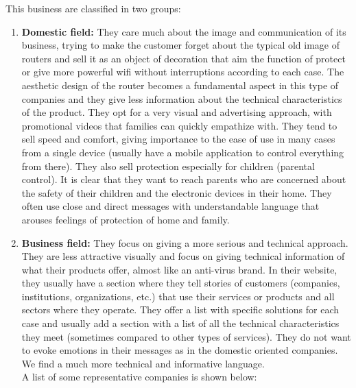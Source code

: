 This business are classified in two groups:
\begin{enumerate}
	\item \textbf{Domestic field:} They care much about the image and communication of its business, trying to make the customer forget about the typical old image of routers and sell it as an object of decoration that aim the function of protect or give more powerful wifi without interruptions according to each case. The aesthetic design of the router becomes a fundamental aspect in this type of companies and they give less information about the technical characteristics of the product. They opt for a very visual and advertising approach, with promotional videos that families can quickly empathize with. They tend to sell speed and comfort, giving importance to the ease of use in many cases from a single device (usually have a mobile application to control everything from there). They also sell protection especially for children (parental control). It is clear that they want to reach parents who are concerned about the safety of their children and the electronic devices in their home. They often use close and direct messages with understandable language that arouses feelings of protection of home and family.
	
	\item \textbf{Business field:} They focus on giving a more serious and technical approach. They are less attractive visually and focus on giving technical information of what their products offer, almost like an anti-virus brand. In their website, they usually have a section where they tell stories of customers (companies, institutions, organizations, etc.) that use their services or products and all sectors where they operate. They offer a list with specific solutions for each case and usually add a section with a list of all the technical characteristics they meet (sometimes compared to other types of services). They do not want to evoke emotions in their messages as in the domestic oriented companies. We find a much more technical and informative language.
	\\
	
	A list of some representative companies is shown below:
	
\end{enumerate}
